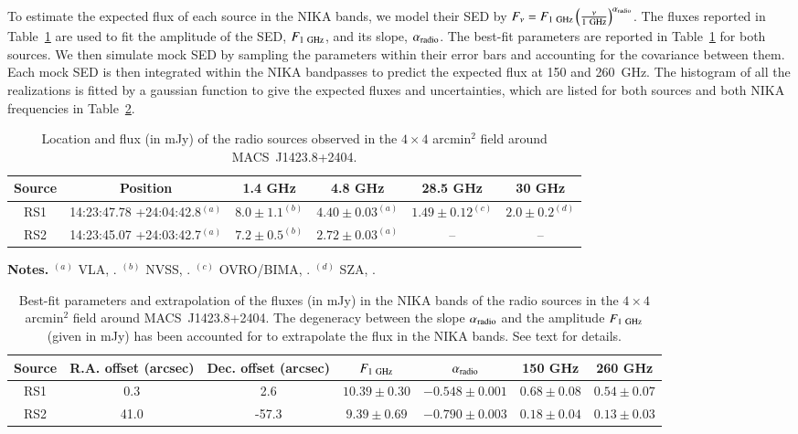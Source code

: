 \documentclass[twocolumn,traditabstract]{aa}
\begin{document}
To estimate the expected flux of each source in the NIKA bands, we model their SED by $F_{\nu} = F_{1 \ {\rm GHz}} \left(\frac{\nu}{1 \ {\rm GHz}}\right)^{\alpha_{\rm radio}}$. The fluxes reported in Table~\ref{tab:Radio_ps} are used to fit the amplitude of the SED, $F_{1 \ {\rm GHz}}$, and its slope, $\alpha_{\rm radio}$. The best-fit parameters are reported in Table~\ref{tab:Radio_ps} for both sources. We then simulate mock SED by sampling the parameters within their error bars and accounting for the covariance between them. Each mock SED is then integrated within the NIKA bandpasses to predict the expected flux at 150 and 260~GHz. The histogram of all the realizations is fitted by a gaussian function to give the expected fluxes and uncertainties, which are listed for both sources and both NIKA frequencies in Table~\ref{tab:Radio_ps2}.
\begin{table}[h]
\caption{Location and flux (in mJy) of the radio sources observed in the $4 \times 4$ arcmin$^2$ field around \mbox{MACS~J1423.8+2404}.}
\begin{center}
\begin{tabular}{cccccc}
\hline
\hline
Source & Position & 1.4 GHz & 4.8 GHz & 28.5 GHz & 30 GHz \\
\hline
RS1 & 14:23:47.78 +24:04:42.8$^{(a)}$ & $8.0 \pm 1.1 ^{(b)}$ & $4.40 \pm 0.03 ^{(a)}$ & $1.49 \pm 0.12 ^{(c)}$ & $2.0 \pm 0.2 ^{(d)}$ \\  
RS2 & 14:23:45.07 +24:03:42.7$^{(a)}$ & $7.2 \pm 0.5 ^{(b)}$ & $2.72 \pm 0.03 ^{(a)}$ &  -- & --  \\  
\hline
\end{tabular}
\end{center}
{\small {\bf Notes.} $^{(a)}$ VLA, \cite{laroque2003}. $^{(b)}$ NVSS, \cite{condon1998}. $^{(c)}$ OVRO/BIMA, \cite{coble2007}. $^{(d)}$ SZA, \cite{bonamente2012}.}
\label{tab:Radio_ps}
\end{table}

\begin{table}[h]
\caption{Best-fit parameters and extrapolation of the fluxes (in mJy) in the NIKA bands of the radio sources in the $4 \times 4$ arcmin$^2$ field around \mbox{MACS~J1423.8+2404}. The degeneracy between the slope $\alpha_{\rm radio}$ and the amplitude $F_{1 \ {\rm GHz}}$ (given in mJy) has been accounted for to extrapolate the flux in the NIKA bands. See text for details.}
\begin{center}
\begin{tabular}{ccccccc}
\hline
\hline
Source & R.A. offset (arcsec) & Dec. offset (arcsec) & $F_{1 \ {\rm GHz}}$ & $\alpha_{\rm radio}$ & 150 GHz & 260 GHz \\
\hline
RS1 &      0.3 &      2.6 & $   10.39 \pm     0.30$ & $  -0.548 \pm    0.001$ & $    0.68 \pm     0.08$ & $    0.54 \pm     0.07$ \\
RS2 &     41.0 &    -57.3 & $    9.39 \pm     0.69$ & $  -0.790 \pm    0.003$ & $    0.18 \pm     0.04$ & $    0.13 \pm     0.03$ \\
\hline
\end{tabular}
\end{center}
\label{tab:Radio_ps2}
\end{table}
\end{document}
